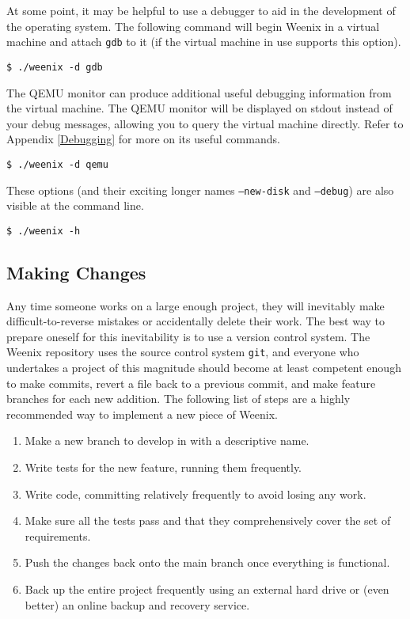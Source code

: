 At some point, it may be helpful to use a debugger to aid in the development of the operating system. The following command will begin Weenix in a virtual machine and attach \texttt{gdb} to it (if the virtual machine in use supports this option).
\begin{verbatim}
$ ./weenix -d gdb\end{verbatim}

The QEMU monitor can produce additional useful debugging information from the virtual machine. The QEMU monitor will be displayed on stdout instead of your debug messages, allowing you to query the virtual machine directly. Refer to Appendix \ref{Debugging} for more on its useful commands.
\begin{verbatim}
$ ./weenix -d qemu\end{verbatim}

These options (and their exciting longer names \texttt{--new-disk} and \texttt{--debug}) are also visible at the command line.
\begin{verbatim}
$ ./weenix -h\end{verbatim}



\subsection{Making Changes}
Any time someone works on a large enough project, they will inevitably make difficult-to-reverse mistakes or accidentally delete their work. The best way to prepare oneself for this inevitability is to use a version control system. The Weenix repository uses the source control system \texttt{git}, and everyone who undertakes a project of this magnitude should become at least competent enough to make commits, revert a file back to a previous commit, and make feature branches for each new addition. The following list of steps are a highly recommended way to implement a new piece of Weenix.
\begin{enumerate}
    \item Make a new branch to develop in with a descriptive name.
    \item Write tests for the new feature, running them frequently.
    \item Write code, committing relatively frequently to avoid losing any work.
    \item Make sure all the tests pass and that they comprehensively cover the set of requirements.
    \item Push the changes back onto the main branch once everything is functional.
    \item Back up the entire project frequently using an external hard drive or (even better) an online backup and recovery service.
\end{enumerate}

